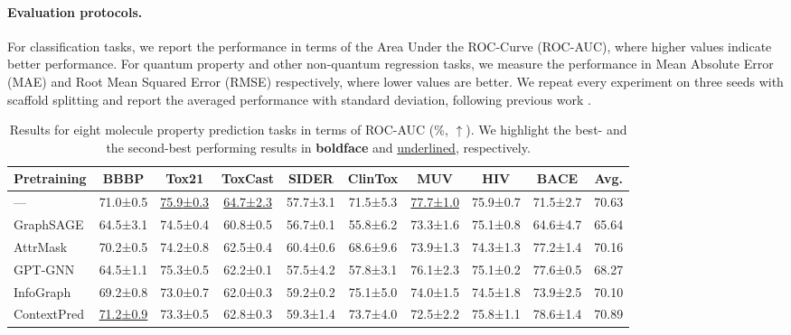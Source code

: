 \paragraph{Evaluation protocols.}
For classification tasks, we report the performance in terms of the Area Under the ROC-Curve (ROC-AUC), where higher values indicate better performance.
For quantum property and other non-quantum regression tasks, we measure the performance in Mean Absolute Error (MAE) and Root Mean Squared Error (RMSE) respectively, where lower values are better.
We repeat every experiment on three seeds with scaffold splitting and report the averaged performance with standard deviation, following previous work \cite{Liu:2022vr}.

\begin{table}
	\centering
	\caption{Results for eight molecule property prediction tasks in terms of ROC-AUC (\%, \(\uparrow\)). We highlight the best- and the second-best performing results in \textbf{boldface} and \underline{underlined}, respectively.}
	\label{tab:classification}
	\begin{tabular}{lccccccccc}
    \toprule
    Pretraining & BBBP & Tox21 & ToxCast & SIDER & ClinTox & MUV & HIV & BACE & Avg. \\
    \midrule
    --- & 71.0{\tiny±0.5} & \underline{75.9{\tiny±0.3}} & \underline{64.7{\tiny±2.3}} & 57.7{\tiny±3.1} & 71.5{\tiny±5.3} & \underline{77.7{\tiny±1.0}} & 75.9{\tiny±0.7} & 71.5{\tiny±2.7} & 70.63 \\
    \midrule
    GraphSAGE & 64.5{\tiny±3.1} & 74.5{\tiny±0.4} & 60.8{\tiny±0.5} & 56.7{\tiny±0.1} & 55.8{\tiny±6.2} & 73.3{\tiny±1.6} & 75.1{\tiny±0.8} & 64.6{\tiny±4.7} & 65.64 \\
    AttrMask & 70.2{\tiny±0.5} & 74.2{\tiny±0.8} & 62.5{\tiny±0.4} & 60.4{\tiny±0.6} & 68.6{\tiny±9.6} & 73.9{\tiny±1.3} & 74.3{\tiny±1.3} & 77.2{\tiny±1.4} & 70.16 \\
    GPT-GNN & 64.5{\tiny±1.1} & 75.3{\tiny±0.5} & 62.2{\tiny±0.1} & 57.5{\tiny±4.2} & 57.8{\tiny±3.1} & 76.1{\tiny±2.3} & 75.1{\tiny±0.2} & 77.6{\tiny±0.5} & 68.27 \\
    InfoGraph & 69.2{\tiny±0.8} & 73.0{\tiny±0.7} & 62.0{\tiny±0.3} & 59.2{\tiny±0.2} & 75.1{\tiny±5.0} & 74.0{\tiny±1.5} & 74.5{\tiny±1.8} & 73.9{\tiny±2.5} & 70.10 \\
    ContextPred & \underline{71.2{\tiny±0.9}} & 73.3{\tiny±0.5} & 62.8{\tiny±0.3} & 59.3{\tiny±1.4} & 73.7{\tiny±4.0} & 72.5{\tiny±2.2} & 75.8{\tiny±1.1} & 78.6{\tiny±1.4} & 70.89 \\

\end{tabular}
\end{table}
